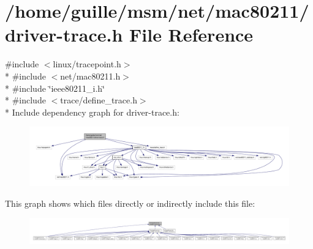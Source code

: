 \hypertarget{driver-trace_8h}{\section{/home/guille/msm/net/mac80211/driver-\/trace.h File Reference}
\label{driver-trace_8h}
}
{\ttfamily \#include $<$linux/tracepoint.\-h$>$}\\*
{\ttfamily \#include $<$net/mac80211.\-h$>$}\\*
{\ttfamily \#include \char`\"{}ieee80211\-\_\-i.\-h\char`\"{}}\\*
{\ttfamily \#include $<$trace/define\-\_\-trace.\-h$>$}\\*
Include dependency graph for driver-\/trace.h\-:
\nopagebreak
\begin{figure}[H]
\begin{center}
\leavevmode
\includegraphics[width=350pt]{driver-trace_8h__incl}
\end{center}
\end{figure}
This graph shows which files directly or indirectly include this file\-:
\nopagebreak
\begin{figure}[H]
\begin{center}
\leavevmode
\includegraphics[width=350pt]{driver-trace_8h__dep__incl}
\end{center}
\end{figure}
